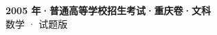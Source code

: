 \documentclass[zihao=-4, a4paper]{ctexart}
\begin{document}
\begin{center}
  {\Large\bfseries 2005 年·普通高等学校招生考试·重庆卷·文科}\\[4pt]
  {\large 数学 · 试题版}
\end{center}
\medskip
{}

\end{document}
